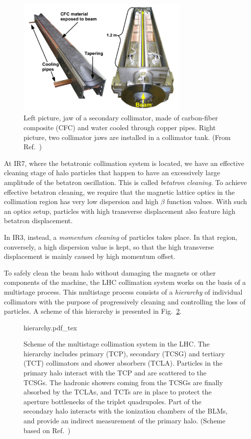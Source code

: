 \begin{figure}[thp]
    \centering
    \includegraphics[width=0.75\textwidth]{5_Diffusion_measurement_LHC/figs/collimator_pics.png}
    \caption{Left picture, jaw of a secondary collimator, made of carbon-fiber composite (CFC) and water cooled through copper pipes. Right picture, two collimator jaws are installed in a collimator tank. (From Ref.~\cite{bruce2014simulations})}
    \label{fig:collimator_pics}
\end{figure}

At IR7, where the betatronic collimation system is located, we have an effective cleaning stage of halo particles that happen to have an excessively large amplitude of the betatron oscillation. This is called \textit{betatron cleaning}. To achieve effective betatron cleaning, we require that the magnetic lattice optics in the collimation region has very low dispersion and high $\beta$ function values. With such an optics setup, particles with high transverse displacement also feature high betatron displacement.

In IR3, instead, a \textit{momentum cleaning} of particles takes place. In that region, conversely, a high dispersion value is kept, so that the high transverse displacement is mainly caused by high momentum offset.

To safely clean the beam halo without damaging the magnets or other components of the machine, the LHC collimation system works on the basis of a multistage process. This multistage process consists of a \textit{hierarchy} of individual collimators with the purpose of progressively cleaning and controlling the loss of particles. A scheme of this hierarchy is presented in Fig.~\ref{fig:collimator_hierarchy}.

\begin{figure}[t]
    \centering
    \def\svgwidth{1.0\columnwidth}
    {hierarchy.pdf_tex}
    \caption{Scheme of the multistage collimation system in the LHC. The hierarchy includes primary (TCP), secondary (TCSG) and tertiary (TCT) collimators and shower absorbers (TCLA). Particles in the primary halo interact with the TCP and are scattered to the TCSGs. The hadronic showers coming from the TCSGs are finally absorbed by the TCLAs, and TCTs are in place to protect the aperture bottlenecks of the triplet quadrupoles. Part of the secondary halo interacts with the ionization chambers of the BLMs, and provide an indirect measurement of the primary halo. (Scheme based on Ref.~\cite{Hermes:2241364})}
    \label{fig:collimator_hierarchy}
\end{figure}

